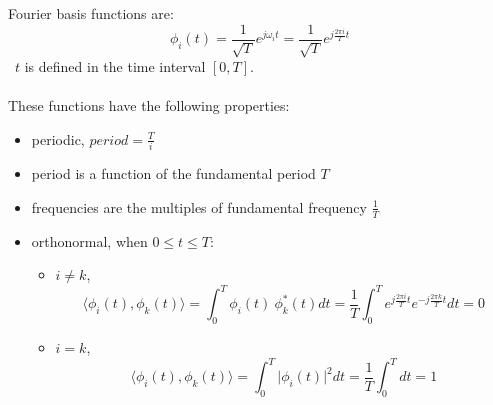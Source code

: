 \documentclass[12pt,a4paper]{article}
\begin{document}
Fourier basis functions are:
\[ \phi_{i}(t) = \frac{1}{\sqrt{T}} e^{j\omega_{i} t} =  \frac{1}{\sqrt{T}} e^{j\frac{2\pi i}{T} t} \]
\ $t$ is defined in the time interval $[0,T]$.\\\\
These functions have the following properties:
\begin{itemize}
 \item periodic, $period = \frac{T}{i}$
 \item period is a function of the fundamental period $T$
 \item frequencies are the multiples of fundamental frequency $\frac{1}{T}$
 \item orthonormal, when $0 \leq t \leq T$:
 \begin{itemize}
   \item $i \neq k$,  \[ \langle \phi_{i}(t), \phi_{k}(t) \rangle = \int_{0}^{T}  \phi_{i}(t) \ \phi_{k}^{*}(t) dt = \frac{1}{T} \int_{0}^{T} e^{j\frac{2\pi i}{T} t}e^{-j\frac{2\pi k}{T} t} dt = 0\]
   \item $i=k$, \[ \langle \phi_{i}(t), \phi_{k}(t) \rangle  = \int_{0}^{T} \lvert \phi_{i}(t) \rvert^{2}dt = \frac{1}{T} \int_{0}^{T}dt =1\]
\end{itemize} \end{itemize}

\end{document}
